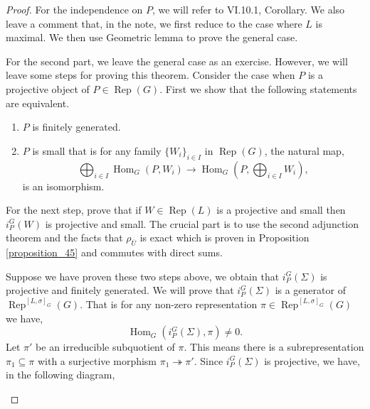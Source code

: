 \documentclass[8pt]{article}
\DeclareMathOperator{\Rep}{Rep}
\DeclareMathOperator{\Hom}{Hom}
\begin{document}
  \begin{proof}
  For the independence on $P$, we will refer to \cite{Renard} VI.10.1, Corollary. We also leave a comment that, in the note, we first reduce to the case where $L$ is maximal. We then use Geometric lemma to prove the general case.
  \par For the second part, we leave the general case as an exercise. However, we will leave some steps for proving this theorem. Consider the case when $P$ is a projective object of $P\in\Rep(G)$. First we show that the following statements are equivalent.
  \begin{enumerate}
    \item $P$ is finitely generated.
    \item $P$ is small that is for any family $\{W_i\}_{i\in I}$ in $\Rep(G)$, the natural map,
    \begin{equation*}
      \bigoplus_{i\in I}\Hom_G(P,W_i) \to \Hom_G\left(P,\bigoplus_{i\in I}W_i\right),
    \end{equation*}
    is an isomorphism.
  \end{enumerate}
  For the next step, prove that if $W\in\Rep(L)$ is a projective and small then $i_P^G(W)$ is projective and small.
  The crucial part is to use the second adjunction theorem and the facts that $\rho_{\overline{U}}$ is exact which is proven in Proposition \ref{proposition_45} and commutes with direct sums.
  \par Suppose we have proven these two steps above, we obtain that $i_P^G(\Sigma)$ is projective and finitely generated. We will prove that $i_P^G(\Sigma)$ is a generator of $\Rep^{[L,\sigma]_G}(G)$. That is for any non-zero representation $\pi\in\Rep^{[L,\sigma]_G}(G)$ we have,
  \begin{equation*}
    \Hom_G(i_P^G(\Sigma),\pi) \not=0.
  \end{equation*}
  Let $\pi'$ be an irreducible subquotient of $\pi$. This means there is a subrepresentation $\pi_1\subseteq\pi$ with a surjective morphism $\pi_1\twoheadrightarrow\pi'$. Since $i_P^G(\Sigma)$ is projective, we have, in the following diagram,
  \begin{center}
  \end{center}

\end{proof}
\end{document}
